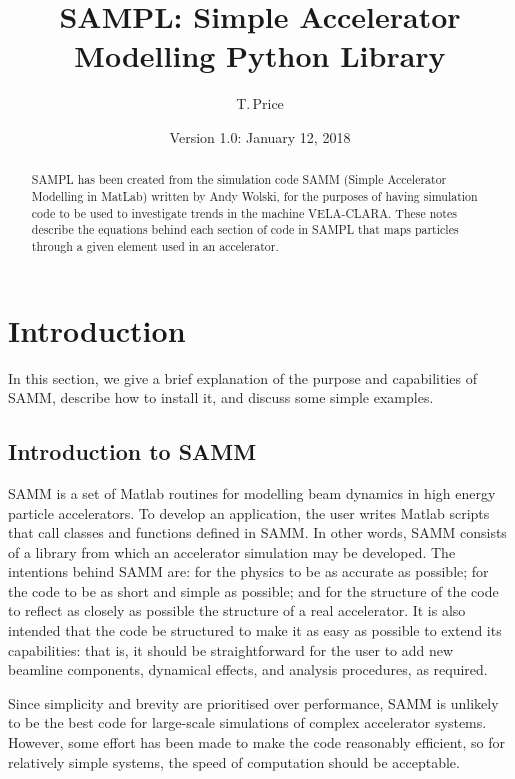 \documentclass[11pt,a4paper]{article}
\begin{document}
	
	\title{SAMPL: Simple Accelerator Modelling Python Library}
	\author{T.\,Price}
	\date{Version 1.0: January 12, 2018}
	
	\maketitle
	
	\begin{abstract}
	SAMPL has been created from the simulation code SAMM (Simple Accelerator Modelling in MatLab) written by Andy Wolski, for the purposes of having simulation code to be used to investigate trends in the machine VELA-CLARA. These notes describe the equations behind each section of code in SAMPL that maps particles through a given element used in an accelerator. 
	\end{abstract}
	
	\newpage
	
	\tableofcontents
	
	\newpage
	\section{Introduction}
	In this section, we give a brief explanation of the purpose and capabilities
	of SAMM, describe how to install it, and discuss some simple examples.
	\subsection{Introduction to SAMM}
	SAMM is a set of Matlab \cite{cite:matlab} routines for modelling beam dynamics in high energy particle accelerators. To develop an application, the user writes Matlab scripts that call classes and functions defined in SAMM. In other words, SAMM consists of a library from which an accelerator simulation may be developed. The intentions behind SAMM are: for the
	physics to be as accurate as possible; for the code to be as short and simple as possible; and for the structure of the code to reflect as closely as possible the structure of a real accelerator.  It is also intended that the code be structured
	to make it as easy as possible to extend its capabilities: that is, it should be straightforward for the user to add new beamline components, dynamical effects, and analysis procedures, as required.
	
	Since simplicity and brevity are prioritised over performance, SAMM is unlikely to be the best code for large-scale simulations of complex accelerator systems. However, some effort has been made to make the code reasonably efficient, so for relatively simple systems, the speed of computation should be acceptable.
	
\end{document}
